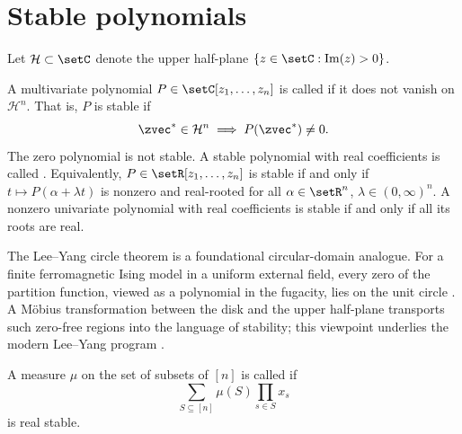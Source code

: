 


\section[stablePolynomial]{Stable polynomials}



Let $\mathcal{H} \subset \setC$ denote the
upper half-plane $\{z \in \setC: \operatorname{Im}(z) > 0 \}$.

\begin{definition}[Stability]

A multivariate polynomial $P \in \setC[z_1,\dotsc,z_n]$
is called \label{stablePolynomialDefinition}
if it does not vanish on $\mathcal{H}^n$.
That is, $P$ is stable if
\[
 \zvec^* \in \mathcal{H}^n \implies P(\zvec^*) \neq 0.
\]
The zero polynomial is not stable. A stable polynomial with real
coefficients is called .
Equivalently, $P \in \setR[z_1,\dotsc,z_n]$ is stable if and only
if $t\mapsto P(\alpha+\lambda t)$ is nonzero and real-rooted for all
$\alpha \in \setR^n$, $\lambda \in (0,\infty)^n$.
A nonzero univariate polynomial with real coefficients
is stable if and only if all its roots are real.
\end{definition}

The Lee--Yang circle theorem is a foundational circular-domain analogue.
For a finite ferromagnetic Ising model in a uniform external field, every zero
of the partition function, viewed as a polynomial in the fugacity, lies on the
unit circle \cite{LeeYang1952}.  A Möbius transformation between the disk and
the upper half-plane transports such zero-free regions into the language of
stability; this viewpoint underlies the modern Lee--Yang program
\cite{BorceaBranden2009I}.





\begin{definition}
\label{stronglyRayleigh}
A measure $\mu$ on the set of subsets of $[n]$ is called
 if
\[
 \sum_{S \subseteq [n]} \mu(S) \prod_{s\in S} x_s
\]
is real stable.
\end{definition}


